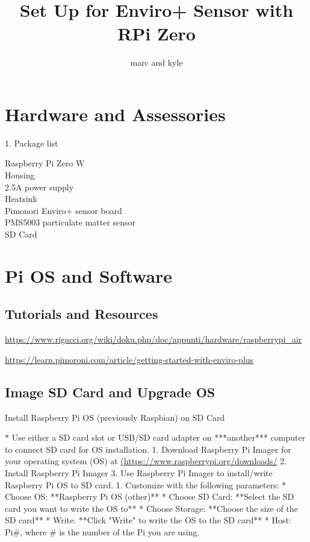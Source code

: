 \documentclass{article}
\author{marc and kyle}
\title{Set Up for Enviro+ Sensor with RPi Zero}
\begin{document}
\maketitle

\section{Hardware and Assessories}

1. Package list
\begin{description}
  \item[Raspberry Pi Zero W]
  \item[Housing]
  \item[2.5A power supply]
  \item[Heatsink]
  \item[Pimonori Enviro+ sensor board]
  \item[PMS5003 particulate matter sensor]
  \item[SD Card]
\end{description}

    
    
    

\section{Pi OS and Software}

\subsection{Tutorials and Resources}

\url{https://www.rigacci.org/wiki/doku.php/doc/appunti/hardware/raspberrypi_air}

\url{https://learn.pimoroni.com/article/getting-started-with-enviro-plus}



\subsection{Image SD Card and Upgrade OS}

Install Raspberry Pi OS (previously Raspbian) on SD Card


* Use either a SD card slot or USB/SD card adapter on ***another*** computer to connect SD card for OS installation.
    1. Download Raspberry Pi Imager for your operating system (OS) at \href{https://www.raspberrypi.org/downloads/}{(https://www.raspberrypi.org/downloads/}
    2. Install Raspberry Pi Imager
    3. Use Raspberry Pi Imager to install/write Raspberry Pi OS to SD card.
        1. Customize with the following parameters: 
            * Choose OS: **Raspberry Pi OS (other)**
            * Choose SD Card: **Select the SD card you want to write the OS to**
            * Choose Storage: **Choose the size of the SD card**
            * Write: **Click "Write" to write the OS to the SD card**
            * Host: Pi\#, where \# is the number of the Pi you are using.
\end{document}
